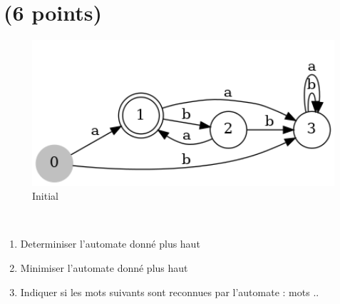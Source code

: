\documentclass[]{article}
\begin{document}
    \section{(6 points)}
    \begin{figure}[htbp]
        \centering
        \includegraphics[width=15cm]{automateInitial.png}
        \caption{Initial}\label{fig:3.1}
    \end{figure}\

    \begin{enumerate}
        \item  Determiniser l'automate donné plus haut

        \item Minimiser l'automate donné plus haut

        \item Indiquer si les mots suivants sont reconnues par l'automate : {mots ..}

    \end{enumerate}


    \clearpage
\end{document}
